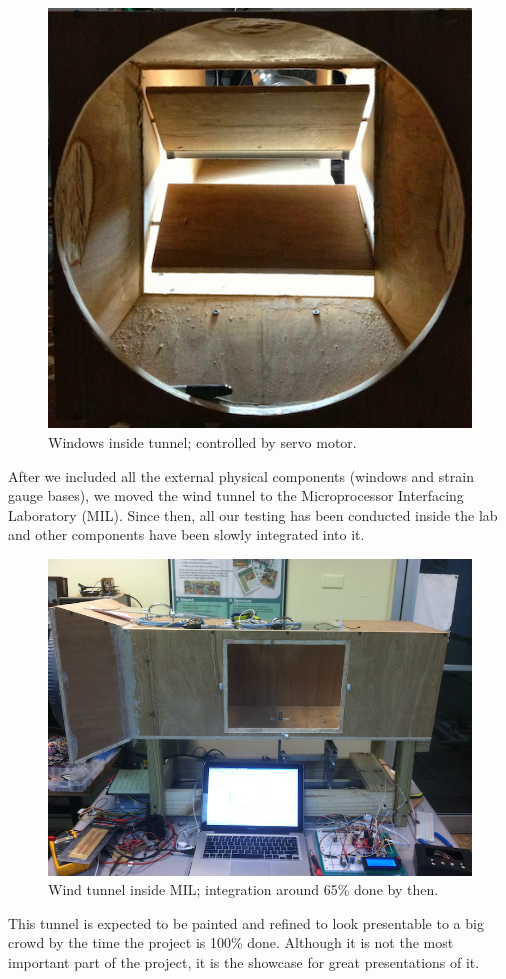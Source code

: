 		\begin{figure}[H]
			\centering
				\includegraphics[scale=0.2]{img/Windows}
			\caption{Windows inside tunnel; controlled by servo motor.}
		\end{figure}
		
		After we included all the external physical components (windows and strain gauge bases), we moved the wind tunnel to the Microprocessor Interfacing Laboratory (MIL). Since then, all our testing has been conducted inside the lab and other components have been slowly integrated into it.
		
		\begin{figure}[H]
			\centering
				\includegraphics[scale=0.1]{img/WindTunnelMIL}
			\caption{Wind tunnel inside MIL; integration around 65\% done by then.}
		\end{figure}
		
		This tunnel is expected to be painted and refined to look presentable to a big crowd by the time the project is 100\% done. Although it is not the most important part of the project, it is the showcase for great presentations of it.
		
		